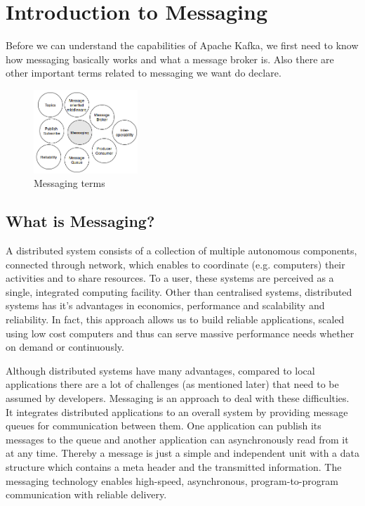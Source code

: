 \chapter{Introduction to Messaging} 

Before we can understand the capabilities of Apache Kafka, we first need to
know how messaging basically works and what a message broker is. Also there are other
important terms related to messaging we want do declare. 

\begin{figure}[H]
    \centering
    \includegraphics[width=0.35\textwidth]{images/messaging-intro.png}
    \caption{Messaging terms}
    \label{fig:MBig:the-log}
\end{figure}

\section{What is Messaging?}
A distributed system consists of a collection of multiple autonomous components,
connected through network, which enables to coordinate  (e.g. computers) their
activities and to share resources. To a user, these systems are perceived as a
single, integrated computing facility. Other than centralised systems,
distributed systems has it's advantages in economics, performance and
scalability and reliability. In fact, this approach allows us to build reliable
applications, scaled using low cost computers and thus can serve massive
performance needs whether on demand or continuously.\cite{POSA1}\cite{TAN06}

Although distributed systems have many advantages, compared to local
applications there are a lot of challenges (as mentioned later) that need to be
assumed by developers. Messaging is an approach to deal with these difficulties.
It integrates distributed applications to an overall system by providing message
queues for communication between them. One application can publish its messages
to the queue and another application can asynchronously read from it at any time.
Thereby a message is just a simple and independent unit with a data structure
which contains a meta header and the transmitted information. The messaging
technology enables high-speed, asynchronous, program-to-program communication
with reliable delivery.

